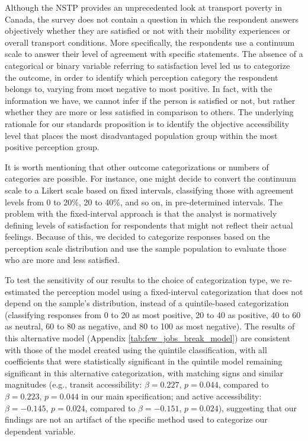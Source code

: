 \documentclass[preprint, 3p,
authoryear]{elsarticle} %
\begin{document}
Although the NSTP provides an unprecedented look at transport poverty in
Canada, the survey does not contain a question in which the respondent
answers objectively whether they are satisfied or not with their
mobility experiences or overall transport conditions. More specifically,
the respondents use a continuum scale to answer their level of agreement
with specific statements. The absence of a categorical or binary
variable referring to satisfaction level led us to categorize the
outcome, in order to identify which perception category the respondent
belongs to, varying from most negative to most positive. In fact, with
the information we have, we cannot infer if the person is satisfied or
not, but rather whether they are more or less satisfied in comparison to
others. The underlying rationale for our standards proposition is to
identify the objective accessibility level that places the most
disadvantaged population group within the most positive perception
group.

It is worth mentioning that other outcome categorizations or numbers of
categories are possible. For instance, one might decide to convert the
continuum scale to a Likert scale based on fixed intervals, classifying
those with agreement levels from 0 to 20\%, 20 to 40\%, and so on, in
pre-determined intervals. The problem with the fixed-interval approach
is that the analyst is normatively defining levels of satisfaction for
respondents that might not reflect their actual feelings. Because of
this, we decided to categorize responses based on the perception scale
distribution and use the sample population to evaluate those who are
more and less satisfied.

To test the sensitivity of our results to the choice of categorization
type, we re-estimated the perception model using a fixed-interval
categorization that does not depend on the sample's distribution,
instead of a quintile-based categorization (classifying responses from 0
to 20 as most positive, 20 to 40 as positive, 40 to 60 as neutral, 60 to
80 as negative, and 80 to 100 as most negative). The results of this
alternative model (Appendix \ref{tab:few_jobs_break_model}) are
consistent with those of the model created using the quintile
classification, with all coefficients that were statistically
significant in the quintile model remaining significant in this
alternative categorization, with matching signs and similar magnitudes
(e.g., transit accessibility: \(\beta = 0.227\), \(p = 0.044\), compared
to \(\beta = 0.223\), \(p = 0.044\) in our main specification; and
active accessibility: \(\beta = -0.145\), \(p = 0.024\), compared to
\(\beta = -0.151\), \(p = 0.024\)), suggesting that our findings are not
an artifact of the specific method used to categorize our dependent
variable.
\end{document}
